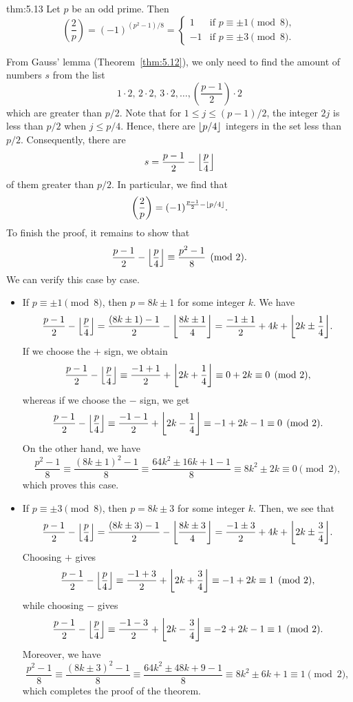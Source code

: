 \begin{theo}{thm:5.13}
    Let $p$ be an odd prime. Then 
    \[ \left( \frac2p \right) = (-1)^{(p^2-1)/8} = \begin{cases} 
        1 & \text{if } p \equiv \pm1 \pmod 8, \\ 
        -1 & \text{if } p \equiv \pm3 \pmod 8. 
    \end{cases} \] 
\end{theo}
\begin{pf}
    From Gauss' lemma (Theorem~\ref{thm:5.12}), we only need to find the amount 
    of numbers $s$ from the list 
    \[ 1\cdot 2,\,2\cdot 2,\,3 \cdot 2, \dots, \left( \frac{p-1}2 \right) \cdot 2 \] 
    which are greater than $p/2$. Note that for $1 \leq j \leq (p-1)/2$, the 
    integer $2j$ is less than $p/2$ when $j \leq p/4$. Hence, there are 
    $\floor{p/4}$ integers in the set less than $p/2$. Consequently, there are 
    \[ s = \frac{p-1}2 - \floor*{\frac p4} \] 
    of them greater than $p/2$. In particular, we find that 
    \[ \left( \frac2p \right) = (-1)^{\frac{p-1}2 - \floor{p/4}}. \] 
    To finish the proof, it remains to show that 
    \[ \frac{p-1}2 - \floor*{\frac p4} \equiv \frac{p^2 - 1}8 \pmod 2. \] 
    We can verify this case by case. 
    \begin{itemize}
        \item If $p \equiv \pm1 \pmod 8$, then $p = 8k\pm 1$ for some integer $k$. 
        We have 
        \[ \frac{p-1}2 - \floor*{\frac p4} = \frac{(8k\pm 1) - 1}2 
        - \floor*{\frac{8k\pm 1}4} = \frac{-1\pm 1}2 + 4k + \floor*{2k \pm \frac14}. \] 
        If we choose the $+$ sign, we obtain 
        \[ \frac{p-1}2 - \floor*{\frac p4} \equiv \frac{-1 + 1}2 + 
        \floor*{2k + \frac14} \equiv 0 + 2k \equiv 0 \pmod 2, \] 
        whereas if we choose the $-$ sign, we get 
        \[ \frac{p-1}2 - \floor*{\frac p4} \equiv \frac{-1-1}2 + 
        \floor*{2k - \frac14} \equiv -1 + 2k - 1 \equiv 0 \pmod 2. \] 
        On the other hand, we have 
        \[ \frac{p^2-1}8 \equiv \frac{(8k\pm 1)^2 - 1}8 \equiv 
        \frac{64k^2 \pm 16k + 1 - 1}8 \equiv 8k^2 \pm 2k \equiv 0 \pmod 2, \] 
        which proves this case. 
        \item If $p \equiv \pm3 \pmod 8$, then $p = 8k\pm 3$ for some integer $k$. 
        Then, we see that 
        \[ \frac{p-1}2 - \floor*{\frac p4} = \frac{(8k\pm 3) - 1}2 
        - \floor*{\frac{8k\pm 3}4} = \frac{-1\pm 3}2 + 4k + \floor*{2k \pm \frac34}. \]
        Choosing $+$ gives 
        \[ \frac{p-1}2 - \floor*{\frac p4} \equiv \frac{-1 + 3}2 + 
        \floor*{2k + \frac34} \equiv -1 + 2k \equiv 1 \pmod 2, \] 
        while choosing $-$ gives 
        \[ \frac{p-1}2 - \floor*{\frac p4} \equiv \frac{-1-3}2 + 
        \floor*{2k - \frac34} \equiv -2 + 2k - 1 \equiv 1 \pmod 2. \]
        Moreover, we have 
        \[ \frac{p^2-1}8 \equiv \frac{(8k\pm 3)^2 - 1}8 \equiv 
        \frac{64k^2 \pm 48k + 9 - 1}8 \equiv 8k^2 \pm 6k + 1 \equiv 1 \pmod 2, \] 
        which completes the proof of the theorem. \qedhere 
    \end{itemize}
\end{pf}

